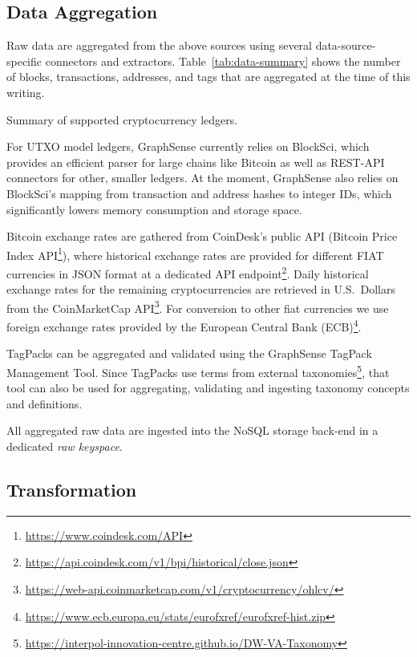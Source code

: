 \subsection{Data Aggregation}

Raw data are aggregated from the above sources using several
data-source-specific connectors and extractors. Table~\ref{tab:data-summary} shows the number of blocks, transactions, addresses, and tags that are aggregated at the time of this writing.

\begin{table}[h]
  \centering%
  \caption{Summary of supported cryptocurrency ledgers.}%
  \label{tab:data-summary}%
\end{table}

For UTXO model ledgers, GraphSense currently relies on BlockSci, which provides an efficient parser for large chains like Bitcoin as well as REST-API connectors for other, smaller ledgers. At the moment, GraphSense also relies on BlockSci's mapping from transaction and address hashes to integer IDs, which significantly lowers memory consumption and storage space.

Bitcoin exchange rates are gathered from CoinDesk's public API (Bitcoin Price Index API\footnote{\url{https://www.coindesk.com/API}}), where historical exchange rates are provided for different FIAT currencies in JSON format at a dedicated API endpoint\footnote{\url{https://api.coindesk.com/v1/bpi/historical/close.json}}. Daily historical exchange rates for the remaining cryptocurrencies are retrieved in U.S.\ Dollars from the CoinMarketCap API\footnote{\url{https://web-api.coinmarketcap.com/v1/cryptocurrency/ohlcv/}}. For conversion to other fiat currencies we use foreign exchange rates provided by the European Central Bank (ECB)\footnote{\url{https://www.ecb.europa.eu/stats/eurofxref/eurofxref-hist.zip}}.

TagPacks can be aggregated and validated using the GraphSense TagPack Management Tool. Since TagPacks use terms from external taxonomies\footnote{\url{https://interpol-innovation-centre.github.io/DW-VA-Taxonomy}}, that tool can also be used for aggregating, validating and ingesting taxonomy concepts and definitions.

All aggregated raw data are ingested into the NoSQL storage back-end in a dedicated \emph{raw keyspace}.

\subsection{Transformation}

